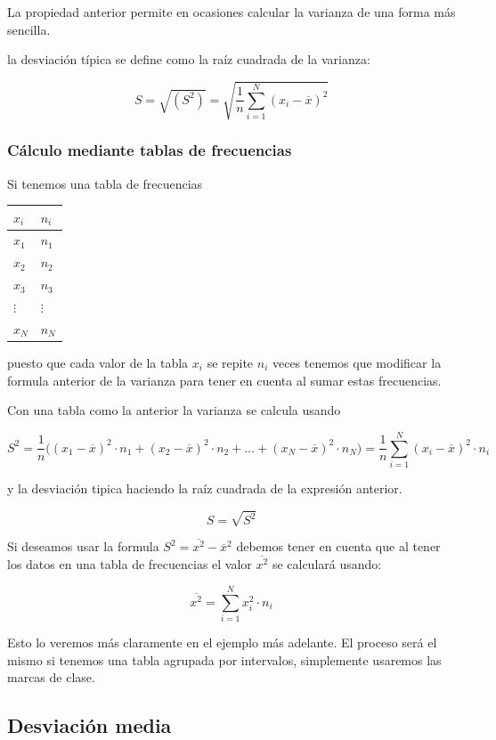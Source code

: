 \documentclass[
]{article}
\begin{document}
La propiedad anterior permite en ocasiones calcular la varianza de una
forma más sencilla.

la desviación típica se define como la raíz cuadrada de la varianza:

\[S = \sqrt{(S^2)} = \sqrt{\frac{1}{n}\sum^N_{i=1} (x_i - \overline x)^2}\]

\hypertarget{cuxe1lculo-mediante-tablas-de-frecuencias}{%
\subsubsection{Cálculo mediante tablas de
frecuencias}\label{cuxe1lculo-mediante-tablas-de-frecuencias}}

Si tenemos una tabla de frecuencias

\begin{longtable}[]{@{}ll@{}}
\toprule
\(x_i\) & \(n_i\)\tabularnewline
\midrule
\endhead
\(x_1\) & \(n_1\)\tabularnewline
\(x_2\) & \(n_2\)\tabularnewline
\(x_3\) & \(n_3\)\tabularnewline
\(\vdots\) & \(\vdots\)\tabularnewline
\(x_N\) & \(n_N\)\tabularnewline
\bottomrule
\end{longtable}

puesto que cada valor de la tabla \(x_i\) se repite \(n_i\) veces
tenemos que modificar la formula anterior de la varianza para tener en
cuenta al sumar estas frecuencias.

Con una tabla como la anterior la varianza se calcula usando

\[S^2 = \frac{1}{n}\big( (x_1 - \overline x)^2 \cdot n_1 + (x_2 - \overline x)^2 \cdot n_2 + \ldots + (x_N - \overline x)^2 \cdot n_N \big)= \frac{1}{n}\sum^N_{i=1} (x_i - \overline x)^2 \cdot n_i\]

y la desviación tipica haciendo la raíz cuadrada de la expresión
anterior.

\[S = \sqrt{S^2}\]

Si deseamos usar la formula \(S^2 = \overline{x^2} - \overline x^2\)
debemos tener en cuenta que al tener los datos en una tabla de
frecuencias el valor \(\overline{x^2}\) se calculará usando:

\[\overline{x^2} = \sum^N_{i=1} x^2_i \cdot n_i\]

Esto lo veremos más claramente en el ejemplo más adelante. El proceso
será el mismo si tenemos una tabla agrupada por intervalos, simplemente
usaremos las marcas de clase.

\hypertarget{desviaciuxf3n-media}{%
\subsection{Desviación media}\label{desviaciuxf3n-media}}
\end{document}
